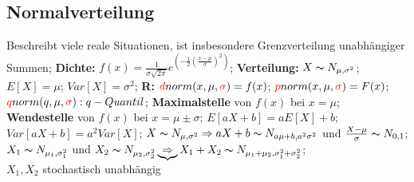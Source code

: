 \subsection{Normalverteilung}
Beschreibt viele reale Situationen, ist insbesondere Grenzverteilung unabhängiger Summen; 
\textbf{Dichte:} 
$f(x) = \frac{1}{\sigma\sqrt{2\pi}}e^{(-\frac{1}{2}(\frac{x-\mu}{\sigma})^2)}$; 
\textbf{Verteilung:} 
$X \thicksim N_{\mu, \sigma^2} $; 
$E[X] = \mu $; 
$Var[X] = \sigma^2 $; 
\textbf{R:} 
$\textcolor{red}{d} norm(x,\mu,\textcolor{red}{\sigma})=f(x) $; 
$\textcolor{red}{p} norm(x,\mu,\textcolor{red}{\sigma})=F(x) $; 
$\textcolor{red}{q} norm(q,\mu,\textcolor{red}{\sigma}):q-Quantil $; 
\textbf{Maximalstelle} von $ f(x) $ bei $ x =\mu $; 
\textbf{Wendestelle} von $ f(x) $ bei $ x = \mu \pm \sigma $; 
$ E[aX + b] = aE[X] + b $; 
$ Var [aX + b] = a^2 Var[X] $; 
$ X \thicksim N_{\mu, \sigma^2} \Rightarrow aX + b \thicksim N_{a\mu+b, a^2\sigma^2}$ und $ \frac{X-\mu}{\sigma} \thicksim N_{0,1} $; 
$ X_ {1} \thicksim N_{\mu_{1}, \sigma_{1}^2}$ und $ X_{2} \thicksim N_{\mu_{2}, \sigma_{2}^2} \underbrace{\Rightarrow} X_{1} + X_{2} \thicksim N_{ \mu_{1} + \mu_{2}, \sigma_{1}^2 + \sigma_{2}^2} $;\\
$ X_{1}, X_{2} $ stochastisch unabhängig
